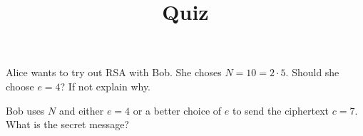 \documentclass[12pt]{amsart}
\theoremstyle{definition}
\begin{document}
\title{Quiz}

\maketitle

Alice wants to try out RSA with Bob. She choses $N = 10 = 2 \cdot 5$. Should 
she choose $e = 4$? If not explain why. 

Bob uses $N$ and either $e=4$ or a better choice of $e$ to send the ciphertext 
$c = 7$. What is the secret message?
\end{document}
